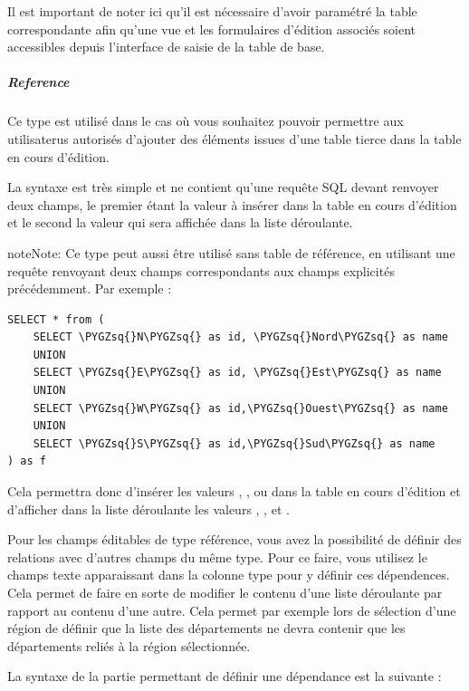 \documentclass[letterpaper,10pt,english]{sphinxmanual}
\def\PYGZsq{\char`\'}
\renewcommand\PYGZsq{\textquotesingle}
\begin{document}
Il est important de noter ici qu'il est nécessaire d'avoir paramétré
la table correspondante afin qu'une vue et les formulaires d'édition
associés soient accessibles depuis l'interface de saisie de la table
de base.


\subparagraph{Reference}
\label{tables/infopanel:reference}
Ce type est utilisé dans le cas où vous souhaitez pouvoir permettre
aux utilisaterus autorisés d'ajouter des éléments issues d'une table
tierce dans la table en cours d'édition.

La syntaxe est très simple et ne contient qu'une requête SQL devant
renvoyer deux champs, le premier étant la valeur à insérer dans la
table en cours d'édition et le second la valeur qui sera affichée dans
la liste déroulante.

\begin{notice}{note}{Note:}
Ce type peut aussi être utilisé sans table de référence, en
utilisant une requête renvoyant deux champs correspondants aux
champs explicités précédemment. Par exemple :

\begin{Verbatim}[commandchars=\\\{\}]
SELECT * from (
    SELECT \PYGZsq{}N\PYGZsq{} as id, \PYGZsq{}Nord\PYGZsq{} as name
    UNION
    SELECT \PYGZsq{}E\PYGZsq{} as id, \PYGZsq{}Est\PYGZsq{} as name
    UNION
    SELECT \PYGZsq{}W\PYGZsq{} as id,\PYGZsq{}Ouest\PYGZsq{} as name
    UNION
    SELECT \PYGZsq{}S\PYGZsq{} as id,\PYGZsq{}Sud\PYGZsq{} as name
) as f
\end{Verbatim}

Cela permettra donc d'insérer les valeurs , ,  ou
  dans la table en cours d'édition et d'afficher dans la
liste déroulante  les valeurs , ,  et .
\end{notice}

Pour les champs éditables de type référence, vous avez la possibilité
de définir des relations avec d'autres champs du même type. Pour ce
faire, vous utilisez le champs texte apparaissant dans la colonne
type pour y définir ces dépendences. Cela permet de faire en sorte de
modifier le contenu d'une liste déroulante par rapport au contenu
d'une autre. Cela permet par exemple lors de sélection d'une région de
définir que la liste des départements ne devra contenir que les
départements reliés à la région sélectionnée.

La syntaxe de la partie permettant de définir une dépendance est la
suivante :
\end{document}
